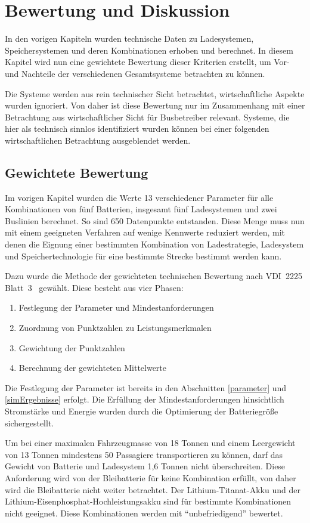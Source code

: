 \chapter{Bewertung und Diskussion} %
In den vorigen Kapiteln wurden technische Daten zu Ladesystemen, Speichersystemen und deren Kombinationen erhoben und berechnet. In diesem Kapitel wird nun eine gewichtete Bewertung dieser Kriterien erstellt, um Vor- und Nachteile der verschiedenen Gesamtsysteme betrachten zu können.

Die Systeme werden aus rein technischer Sicht betrachtet, wirtschaftliche Aspekte wurden ignoriert. Von daher ist diese Bewertung nur im Zusammenhang mit einer Betrachtung aus wirtschaftlicher Sicht für Busbetreiber relevant. Systeme, die hier als technisch sinnlos identifiziert wurden können bei einer folgenden wirtschaftlichen Betrachtung ausgeblendet werden.

\section{Gewichtete Bewertung}
Im vorigen Kapitel wurden die Werte 13 verschiedener Parameter für alle Kombinationen von fünf Batterien, insgesamt fünf Ladesystemen und zwei Buslinien berechnet. So sind 650 Datenpunkte entstanden. Diese Menge muss nun mit einem geeigneten Verfahren auf wenige Kennwerte reduziert werden, mit denen die Eignung einer bestimmten Kombination von Ladestrategie, Ladesystem und Speichertechnologie für eine bestimmte Strecke bestimmt werden kann.

Dazu wurde die Methode der gewichteten technischen Bewertung nach VDI~2225 Blatt~3~\cite{vdi:2225} gewählt. Diese besteht aus vier Phasen:
\begin{enumerate}
	\item Festlegung der Parameter und Mindestanforderungen
	\item Zuordnung von Punktzahlen zu Leistungsmerkmalen
	\item Gewichtung der Punktzahlen
	\item Berechnung der gewichteten Mittelwerte
\end{enumerate}

Die Festlegung der Parameter ist bereits in den Abschnitten \ref{parameter} und \ref{simErgebnisse} erfolgt. Die Erfüllung der Mindestanforderungen hinsichtlich Stromstärke und Energie wurden durch die Optimierung der Batteriegröße sichergestellt.

Um bei einer maximalen Fahrzeugmasse von 18 Tonnen und einem Leergewicht von 13 Tonnen mindestens 50 Passagiere transportieren zu können, darf das Gewicht von Batterie und Ladesystem 1,6 Tonnen nicht überschreiten. Diese Anforderung wird von der Bleibatterie für keine Kombination erfüllt, von daher wird die Bleibatterie nicht weiter betrachtet. Der Lithium-Titanat-Akku und der Lithium-Eisenphosphat-Hochleistungsakku sind für bestimmte Kombinationen nicht geeignet. Diese Kombinationen werden mit "`unbefriedigend"' bewertet.

